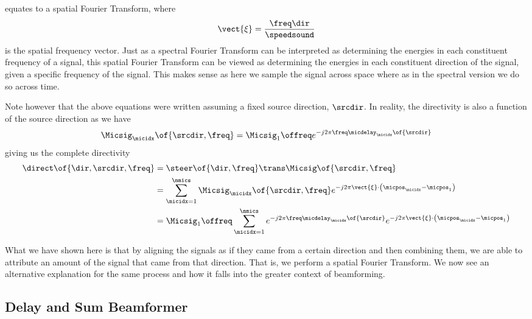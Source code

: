 \documentclass{uiucecethesis09}
\begin{document}
      equates to a spatial Fourier Transform, where
      \begin{equation} \vect{\xi} = \frac{\freq\dir}{\speedsound} \end{equation}
      is the spatial frequency vector. Just as a spectral Fourier Transform can 
      be interpreted as determining the energies in each constituent frequency 
      of a signal, this spatial Fourier Transform can be viewed as determining 
      the energies in each constituent direction of the signal, given a specific 
      frequency of the signal. This makes sense as here we sample the signal 
      across space where as in the spectral version we do so across time.

      Note however that the above equations were written assuming a fixed source 
      direction, $\srcdir$. In reality, the directivity is also a function of 
      the source direction as we have
      \begin{equation} \Micsig_\micidx\of{\srcdir, \freq} = \Micsig_1\offreq
        e^{-j2\pi\freq\micdelay_\micidx\of{\srcdir}} \end{equation}
      giving us the complete directivity
      \begin{align}
        \direct\of{\dir, \srcdir, \freq} &= \steer\of{\dir, \freq}\trans 
        \Micsig\of{\srcdir, \freq}\\
        &= \sum\limits_{\micidx=1}^{\nmics} \Micsig_\micidx\of{\srcdir, \freq}
          e^{-j2\pi\vect{\xi} \cdot \left(\micpos_\micidx - \micpos_1\right)} \\
        &= \Micsig_1\offreq\sum\limits_{\micidx=1}^{\nmics} 
        e^{-j2\pi\freq\micdelay_\micidx\of{\srcdir}}
          e^{-j2\pi\vect{\xi} \cdot \left(\micpos_\micidx - \micpos_1\right)}
      \end{align}

      What we have shown here is that by aligning the signals as if they came 
      from a certain direction and then combining them, we are able to attribute 
      an amount of the signal that came from that direction. That is, we perform 
      a spatial Fourier Transform. We now see an alternative explanation for the 
      same process and how it falls into the greater context of beamforming.

    \subsection{Delay and Sum Beamformer}
\end{document}
